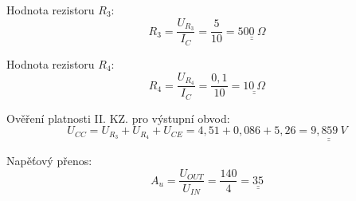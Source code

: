   Hodnota rezistoru $R_3$:
  \begin{equation}
    R_3 = \dfrac{U_{R_3}}{I_C} = \dfrac{5}{10} = \underline{\underline{500~\Omega}}
    \nonumber
  \end{equation} 
  
  Hodnota rezistoru $R_4$:
  \begin{equation}
    R_4 = \dfrac{U_{R_4}}{I_C} = \dfrac{0,1}{10} = \underline{\underline{10~\Omega}}
    \nonumber
  \end{equation} 
   
  Ověření platnosti II. KZ. pro výstupní obvod: 
  \begin{equation}
    U_{CC} = U_{R_3} + U_{R_4} + U_{CE} = 4,51 + 0,086 + 5,26 = \underline{\underline{9,859~V}}
  	\nonumber
  \end{equation} 
  
  Napěťový přenos:
  \begin{equation}
  		A_u = \dfrac{U_{OUT}}{U_{IN}} = \dfrac{140}{4} = \underline{\underline{35}}
  		\nonumber
  \end{equation}
